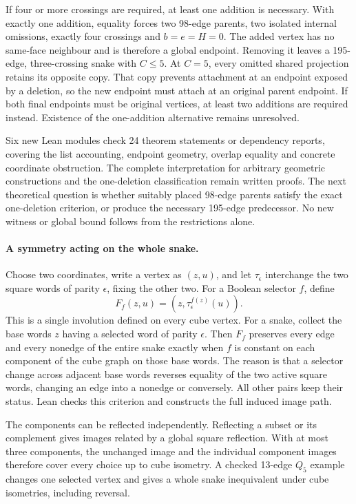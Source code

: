 \documentclass[11pt,a4paper]{article}
\begin{document}
If four or more crossings are required, at least one addition is
necessary. With exactly one addition, equality forces two 98-edge
parents, two isolated internal omissions, exactly four crossings and
$b=e=H=0$. The added vertex has no same-face neighbour and is
therefore a global endpoint. Removing it leaves a 195-edge,
three-crossing snake with $C\le5$. At $C=5$, every omitted shared
projection retains its opposite copy. That copy prevents attachment
at an endpoint exposed by a deletion, so the new endpoint must
attach at an original parent endpoint. If both final endpoints must
be original vertices, at least two additions are required instead.
Existence of the one-addition alternative remains unresolved.

Six new Lean modules check 24 theorem statements or dependency reports,
covering the list accounting, endpoint geometry, overlap equality and
concrete coordinate obstruction. The complete interpretation for arbitrary
geometric constructions and the one-deletion classification remain
written proofs. The next theoretical question is whether suitably
placed 98-edge parents satisfy the exact one-deletion criterion, or
produce the necessary 195-edge predecessor. No new witness or global
bound follows from the restrictions alone.


\paragraph{A symmetry acting on the whole snake.}
Choose two coordinates, write a vertex as $(z,u)$, and let
$\tau_\epsilon$ interchange the two square words of parity
$\epsilon$, fixing the other two. For a Boolean selector $f$, define
\[
F_f(z,u)=(z,\tau_\epsilon^{f(z)}(u)).
\]
This is a single involution defined on every cube vertex. For a snake,
collect the base words $z$ having a selected word of parity $\epsilon$.
Then $F_f$ preserves every edge and every nonedge of the entire snake
exactly when $f$ is constant on each component of the cube graph on
those base words. The reason is that a selector change across adjacent
base words reverses equality of the two active square words, changing
an edge into a nonedge or conversely. All other pairs keep their status.
Lean checks this criterion and constructs the full induced image path.

The components can be reflected independently. Reflecting a subset or
its complement gives images related by a global square reflection.
With at most three components, the unchanged image and the individual
component images therefore cover every choice up to cube isometry.
A checked 13-edge $Q_5$ example changes one selected vertex and gives
a whole snake inequivalent under cube isometries, including reversal.
\end{document}
